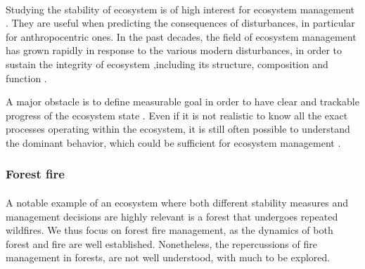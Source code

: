 \documentclass{article}
\begin{document}
\paragraph{}
Studying the stability of ecosystem is of high interest for ecosystem management \citep{mumby_ecological_2014}. They are useful when predicting the consequences of disturbances, in particular for anthropocentric ones. In the past decades, the field of ecosystem management has grown rapidly \citep{grumbine_reflections_1997} in response to the various modern disturbances, in order to sustain the integrity of ecosystem ,including its structure, composition and function \citep{jensen1994overview}. 

A major obstacle is to define measurable goal in order to have clear and trackable progress of the ecosystem state \citep{slocombe_forum:_1998}. Even if it is not realistic to know all the exact processes operating within the ecosystem, it is still often possible to understand the dominant behavior, which could be sufficient for ecosystem management \citep{mori_ecosystem_2011, slocombe_forum:_1998, stanley_ecosystem_1995}.

\subsubsection*{Forest fire}

\paragraph{}
A notable example of an ecosystem where both different stability measures and management decisions are highly relevant is a forest that undergoes repeated wildfires. We thus focus on forest fire management, as the dynamics of both forest and fire are well established. Nonetheless, the repercussions of fire management in forests, are not well understood, with much to be explored.

\paragraph{}
\end{document}
